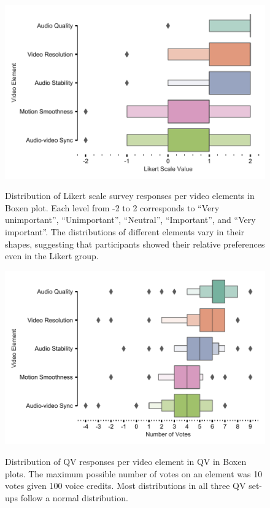 \begin{figure}[htpb]
\centering
\begin{minipage}[t]{0.48\linewidth}
\includegraphics[width=\textwidth, keepaspectratio=true]{content/image/likert_distribution_per_element.pdf}
    \caption{
      Distribution of Likert scale survey responses per video elements in Boxen plot. 
      Each level from -2 to 2 corresponds to 
      ``Very unimportant'', ``Unimportant'', ``Neutral'', ``Important'', and ``Very important''.
      The distributions of different elements vary in their shapes, suggesting that participants showed their relative preferences even in the Likert group.
    }
    \label{fig:likert_exp2}
\end{minipage}
\quad
\begin{minipage}[t]{0.48\linewidth}
\includegraphics[width=\textwidth, keepaspectratio=true]{content/image/qv_distribution_per_element.pdf}
    \caption{
      Distribution of QV responses per video element in QV in Boxen plots. The maximum possible number of votes on an element was 10 votes given 100 voice credits. Most distributions in all three QV set-ups follow a normal distribution. 
    }
    \label{fig:qv3_exp2}
\end{minipage}
\end{figure}

